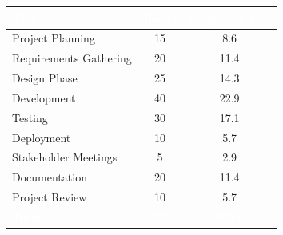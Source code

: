 \documentclass[border=10pt]{standalone}
\begin{document}
\renewcommand{\arraystretch}{1.2}
\begin{tabular}{>{}l S[table-format=2.0] S[table-format=3.1]}
\toprule
{}
\textcolor{white}{\textbf{Task}} & \textcolor{white}{\textbf{Hours}} & \textcolor{white}{\textbf{Frequency (\%)}} \\
\midrule
Project Planning & 15 & 8.6 \\
Requirements Gathering & 20 & 11.4 \\
Design Phase & 25 & 14.3 \\
Development & 40 & 22.9 \\
Testing & 30 & 17.1 \\
Deployment & 10 & 5.7 \\
Stakeholder Meetings & 5 & 2.9 \\
Documentation & 20 & 11.4 \\
Project Review & 10 & 5.7 \\
\midrule
{}
\textcolor{white}{\textbf{Total}} & \textcolor{white}{\textbf{175}} & \textcolor{white}{\textbf{100.0}} \\
\bottomrule
\end{tabular}
\end{document}
